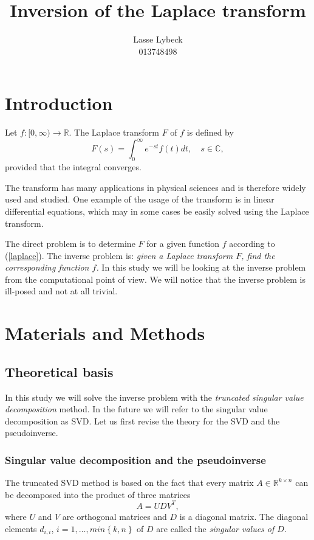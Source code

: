 \documentclass[12pt,a4]{article}
\title{Inversion of the Laplace transform}
\author{Lasse Lybeck\\013748498}
\newcommand{\R}{{\mathbb R}}
\newcommand{\C}{{\mathbb C}}
\begin{document}
\maketitle

\section{Introduction}

Let $f:[0,\infty)\rightarrow \R$. The Laplace transform $F$ of $f$ is defined by
\begin{equation}\label{laplace}
 F(s) = \int_0^\infty e^{-st}f(t)dt,\quad s\in\C ,
\end{equation}
provided that the integral converges.

The transform has many applications in physical sciences and is therefore widely used and studied. One example of the usage of the transform is in linear differential equations, which may in some cases be easily solved using the Laplace transform.

The direct problem is to determine $F$ for a given function $f$ according to (\ref{laplace}). The inverse problem is: {\em given a Laplace transform $F$, find the corresponding function $f$.} In this study we will be looking at the inverse problem from the computational point of view. We will notice that the inverse problem is ill-posed and not at all trivial.




\section{Materials and Methods}\label{sec:methods}

\subsection{Theoretical basis}

In this study we will solve the inverse problem with the \emph{truncated singular value decomposition} method. In the future we will refer to the singular value decomposition as SVD. Let us first revise the theory for the SVD and the pseudoinverse.

\subsubsection{Singular value decomposition and the pseudoinverse}
\label{sec:svd}

The truncated SVD method is based on the fact that every matrix $A \in \R^{k \times n}$ can be decomposed into the product of three matrices
\begin{equation}
A = U D V^T,
\end{equation}
where $U$ and $V$ are orthogonal matrices and $D$ is a diagonal matrix. The diagonal elements $d_{i,i}$, $i = 1, \ldots , min \left\{ k,n \right\}$ of $D$ are called the \emph{singular values of $D$}.
\end{document}
